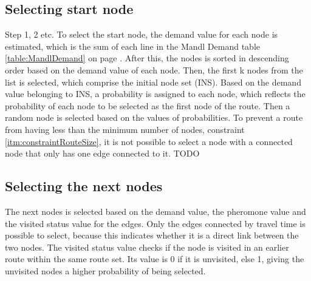 \subsection{Selecting start node}
\begin{algorithm}[H]

 
\end{algorithm}
Step 1, 2 etc. 
To select the start node, the demand value for each node is estimated, which is the sum of each line in the Mandl Demand table \ref{table:MandlDemand} on page \pageref{table:MandlDemand}. After this, the nodes is sorted in descending order based on the demand value of each node. Then, the first k nodes from the list is selected, which comprise the initial node set (INS). Based on the demand value belonging to INS, a probability is assigned to each node, which reflects the probability of each node to be selected as the first node of the route. Then a random node is selected based on the values of probabilities. %
To prevent a route from having less than the minimum number of nodes, constraint \ref{itm:constraintRouteSize}, it is not possible to select a node with a connected node that only has one edge connected to it. TODO

\subsection{Selecting the next nodes}

\begin{algorithm}[H]
\end{algorithm}

The next nodes is selected based on the demand value, the pheromone value and the visited status value for the edges. Only the edges connected by travel time is possible to select, because this indicates whether it is a direct link between the two nodes. The visited status value checks if the node is visited in an earlier route within the same route set. Its value is 0 if it is unvisited, else 1, giving the unvisited nodes a higher probability of being selected. 

